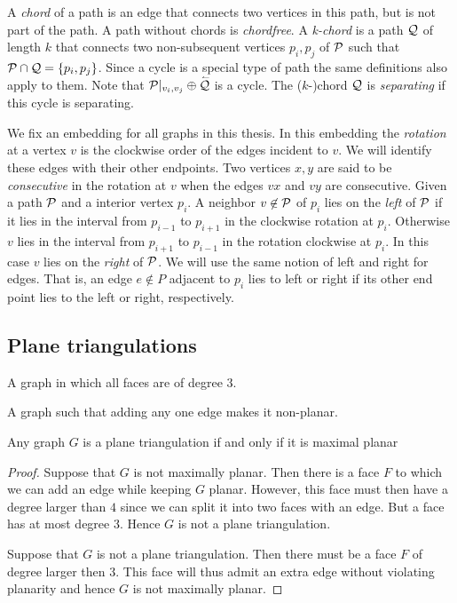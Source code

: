   A \emph{chord} of a path is an edge that connects two vertices in this path, but is not part of the path. A path without chords is \emph{chordfree}.
  A \emph{k-chord} is a path $\Q$ of length $k$ that connects two non-subsequent vertices $p_i, p_j$ of $\P$ such that $\P \cap \Q = \braces{p_i, p_j}$.
  Since a cycle is a special type of path the same definitions also apply to them.
  Note that $\P|_{v_i, v_j} \oplus \rev{\Q}$ is a cycle. The ($k$-)chord $\Q$ is \emph{separating} if this cycle is separating.

  We fix an embedding for all graphs in this thesis. In this embedding the \emph{rotation} at a vertex $v$ is the clockwise order of the edges incident to $v$. We will identify these edges with their other endpoints.
  Two vertices $x, y$ are said to be \emph{consecutive} in the rotation at $v$ when the edges $vx$ and $vy$ are consecutive.
  Given a path $\P$ and a interior vertex $p_i$. A neighbor $v \nin \P$ of $p_i$ lies on the \emph{left} of $\P$ if it lies in the interval from $p_{i-1}$ to $p_{i+1}$ in the clockwise rotation at $p_{i}$. Otherwise $v$ lies in the interval from $p_{i+1}$ to $p_{i-1}$ in the rotation clockwise at $p_i$. In this case $v$ lies on the \emph{right} of $\P$.
  We will use the same notion of left and right for edges. That is, an edge $e\nin P$ adjacent to $p_i$ lies to left or right if its other end point lies to the left or right, respectively.

\subsection{Plane triangulations}

\begin{defi} 
A graph in which all faces are of degree $3$.
\end{defi}

\begin{defi} 
A graph such that adding any one edge makes it non-planar.
\end{defi}

\begin{thrm}
Any graph $G$ is a plane triangulation if and only if it is maximal planar
\end{thrm}

\begin{proof}
Suppose that $G$ is not maximally planar. Then there is a face $F$ to which we can add an edge while keeping $G$ planar. However, this face must then have a degree larger than $4$ since we can split it into two faces with an edge. But a face has at most degree 3. Hence $G$ is not a plane triangulation.

Suppose that $G$ is not a plane triangulation. Then there must be a face $F$ of degree larger then $3$. This face will thus admit an extra edge without violating planarity and hence $G$ is not maximally planar.
\end{proof}

